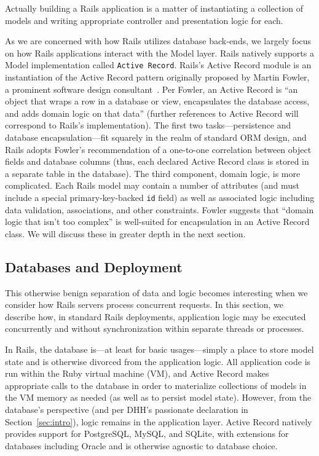 Actually building a Rails application is a matter of instantiating a collection of models and writing appropriate controller and presentation logic for each.

As we are concerned with how Rails utilizes database back-ends, we largely focus on how Rails applications interact with the Model layer. Rails natively supports a Model implementation called \texttt{Active Record}. Rails's Active Record module is an instantiation of the Active Record pattern originally proposed by Martin Fowler, a prominent software design consultant~\cite{fowler-book}. Per Fowler, an Active Record is ``an object that wraps a row in a database or view, encapsulates the database access, and adds domain logic on that data'' (further references to Active Record will correspond to Rails's implementation). The first two tasks---persistence and database encapsulation---fit squarely in the realm of standard ORM design, and Rails adopts Fowler's recommendation of a one-to-one correlation between object fields and database columns (thus, each declared Active Record class is stored in a separate table in the database). The third component, domain logic, is more complicated. Each Rails model may contain a number of attributes (and must include a special primary-key-backed \texttt{id} field) as well as associated logic including data validation, associations, and other constraints. Fowler suggests that ``domain logic that isn't too complex'' is well-suited for encapsulation in an Active Record class. We will discuss these in greater depth in the next section.

\subsection{Databases and Deployment}
\label{sec:deployment}

This otherwise benign separation of data and logic becomes interesting when we consider how Rails servers process concurrent requests. In this section, we describe how, in standard Rails deployments, application logic may be executed concurrently and without synchronization within separate threads or processes.

In Rails, the database is---at least for basic usages---simply a place to store model state and is otherwise divorced from the application logic. All application code is run within the Ruby virtual machine (VM), and Active Record makes appropriate calls to the database in order to materialize collections of models in the VM memory as needed (as well as to persist model state). However, from the database's perspective (and per DHH's passionate declaration in Section~\ref{sec:intro}), logic remains in the application layer. Active Record natively provides support for PostgreSQL, MySQL, and SQLite, with extensions for databases including Oracle and is otherwise agnostic to database choice.

